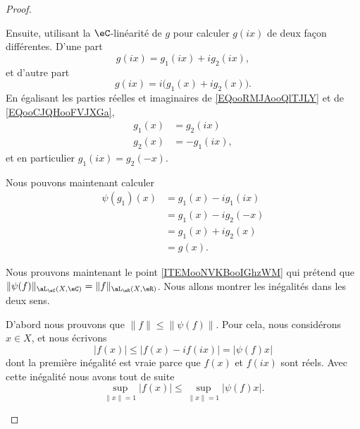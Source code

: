 \begin{proof}
\begin{subproof}
		Ensuite, utilisant la \( \eC\)-linéarité de \( g\) pour calculer \( g(ix)\) de deux façon différentes. D'une part
		\begin{equation}        \label{EQooRMJAooQlTJLY}
			g(ix)=g_1(ix)+ig_2(ix),
		\end{equation}
		et d'autre part
		\begin{equation}        \label{EQooCJQHooFVJXGa}
			g(ix)=i\big( g_1(x)+ig_2(x) \big).
		\end{equation}
		En égalisant les parties réelles et imaginaires de \eqref{EQooRMJAooQlTJLY} et de \eqref{EQooCJQHooFVJXGa},
		\begin{subequations}
			\begin{align}
				g_1(x) & =g_2(ix)   \\
				g_2(x) & =-g_1(ix),
			\end{align}
		\end{subequations}
		et en particulier \( g_1(ix)=g_2(-x)\).

		Nous pouvons maintenant calculer
		\begin{subequations}
			\begin{align}
				\psi(g_1)(x) & =g_1(x)-ig_1(ix) \\
				             & =g_1(x)-ig_2(-x) \\
				             & =g_1(x)+ig_2(x)  \\
				             & =g(x).
			\end{align}
		\end{subequations}

		\spitem[Norme]
		Nous prouvons maintenant le point \ref{ITEMooNVKBooIGhzWM} qui prétend que \( \| \psi(f) \|_{\aL_{\eC}(X,\eC)}=\| f \|_{\aL_{\eR}(X,\eR)}\). Nous allons montrer les inégalités dans les deux sens.

		D'abord nous prouvons que \( \| f \|\leq \| \psi(f) \|\). Pour cela, nous considérons \( x\in X\), et nous écrivons
		\begin{equation}
			| f(x) |\leq | f(x)-if(ix) |=| \psi(f)x |
		\end{equation}
		dont la première inégalité est vraie parce que \( f(x)\) et \( f(ix)\) sont réels. Avec cette inégalité nous avons tout de suite
		\begin{equation}
			\sup_{\| x \|=1}| f(x) |\leq \sup_{\| x \|=1}| \psi(f)x |.
		\end{equation}


\end{subproof}
\end{proof}
